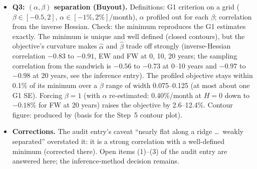 \documentclass[11pt]{article}
\newcommand{\code}[1]{\texttt{\detokenize{#1}}}
\begin{document}
\begin{itemize}
\item \textbf{Q3: $(\alpha,\beta)$ separation (Buyout).} Definitions: G1 criterion on a grid ($\beta\in[-0.5,2]$, $\alpha\in[-1\%,2\%]$/month), $\alpha$ profiled out for each $\beta$; correlation from the inverse Hessian. Check: the minimum reproduces the G1 estimates exactly. The minimum is unique and well defined (closed contours), but the objective's curvature makes $\hat\alpha$ and $\hat\beta$ trade off strongly (inverse-Hessian correlation $-0.83$ to $-0.91$, EW and FW at 0, 10, 20 years; the sampling correlation from the sandwich is $-0.56$ to $-0.73$ at 0--10 years and $-0.97$ to $-0.98$ at 20 years, see the inference entry). The profiled objective stays within 0.1\% of its minimum over a $\beta$ range of width 0.075--0.125 (at most about one G1 SE). Forcing $\beta=1$ (with $\alpha$ re-estimated: 0.40\%/month at $H=0$ down to $-0.18\%$ for FW at 20 years) raises the objective by 2.6--12.4\%. Contour figure: produced by \code{q3_alpha_beta_ridge.R} (basis for the Step~5 contour plot).
\item \textbf{Corrections.} The audit entry's caveat ``nearly flat along a ridge \ldots\ weakly separated'' overstated it: it is a strong correlation with a well-defined minimum (corrected there). Open items (1)--(3) of the audit entry are answered here; the inference-method decision remains.
\end{itemize}
\end{document}
